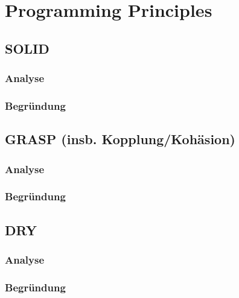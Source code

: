 
\chapter{Programming Principles}

\section{SOLID}
\subsection{Analyse}
\subsection{Begründung}

\section{GRASP (insb. Kopplung/Kohäsion)}
\subsection{Analyse}
\subsection{Begründung}

\section{DRY}
\subsection{Analyse}
\subsection{Begründung}